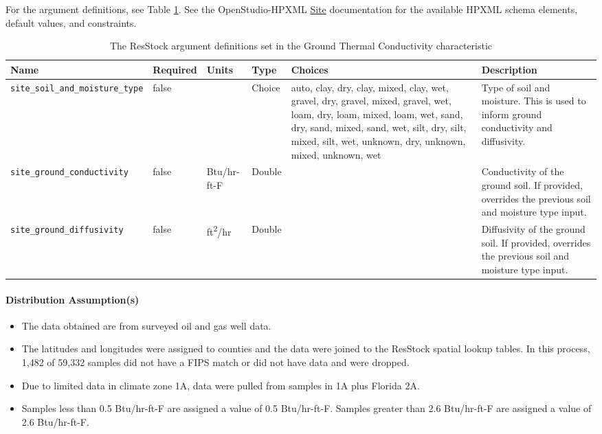 For the argument definitions, see Table \ref{table:hc_arg_def_ground_k}. See the OpenStudio-HPXML \href{https://openstudio-hpxml.readthedocs.io/en/v1.8.1/workflow_inputs.html\#hpxml-site}{Site} documentation for the available HPXML schema elements, default values, and constraints.


\begin{longtable}[]{|p{3.5cm}|p{1.5cm}|p{1.3cm}|p{1.1cm}|p{}|p{3.3cm}|} \caption{The ResStock argument definitions set in the Ground Thermal Conductivity characteristic} \label{table:hc_arg_def_ground_k} \\

\toprule\noalign{}
Name & Required & Units & Type & Choices & Description \\
\midrule\noalign{}
\endhead
\bottomrule\noalign{}
\endlastfoot
\texttt{site\_soil\_and\_moisture\_type} & false & & Choice & auto,
clay, dry, clay, mixed, clay, wet, gravel, dry, gravel, mixed, gravel,
wet, loam, dry, loam, mixed, loam, wet, sand, dry, sand, mixed, sand,
wet, silt, dry, silt, mixed, silt, wet, unknown, dry, unknown, mixed,
unknown, wet & Type of soil and moisture. This is used to inform ground
conductivity and diffusivity.  \\
\texttt{site\_ground\_conductivity} & false & Btu/hr-ft-F & Double & &
Conductivity of the ground soil. If provided, overrides the previous
soil and moisture type input. \\
\texttt{site\_ground\_diffusivity} & false & ft\textsuperscript{2}/hr & Double & &
Diffusivity of the ground soil. If provided, overrides the previous soil
and moisture type input. \\
\end{longtable}
\paragraph{Distribution Assumption(s)}
\begin{itemize}
\item
  The data obtained are from surveyed oil and gas well data.
\item
  The latitudes and longitudes were assigned to counties and the data were
  joined to the ResStock spatial lookup tables. In this process, 1,482 of
  59,332 samples did not have a FIPS match or did not have data and were
  dropped.
\item
  Due to limited data in climate zone 1A, data were pulled from samples
  in 1A plus Florida 2A.
\item
  Samples less than 0.5 Btu/hr-ft-F are assigned a value of 0.5
  Btu/hr-ft-F. Samples greater than 2.6 Btu/hr-ft-F are assigned a value
  of 2.6 Btu/hr-ft-F.
\end{itemize}








